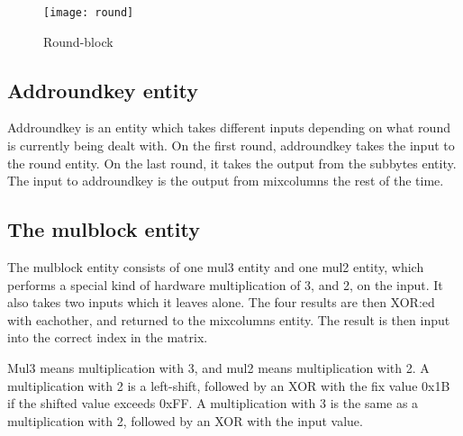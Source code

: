 \begin{figure}[h!]
  \centering
  \texttt{[image: round]}
  \caption{Round-block}
  \label{block:round}
\end{figure}

\subsection{Addroundkey entity}
Addroundkey is an entity which takes different inputs depending on 
what round is currently being dealt with. On the first round, 
addroundkey takes the input to the round entity. On the last round, it 
takes the output from the subbytes entity. The input to addroundkey is 
the output from mixcolumns the rest of the time.

\subsection{The mulblock entity}
The mulblock entity consists of one mul3 entity and one mul2 entity, 
which performs a special kind of hardware multiplication of 3, and 2, 
on the input. It also takes two inputs which it leaves alone. The four 
results are then XOR:ed with eachother, and returned to the mixcolumns 
entity. The result is then input into the correct index in the matrix. 

Mul3 means multiplication with 3, and mul2 means multiplication with 2. 
A multiplication with 2 is a left-shift, followed by an XOR with the 
fix value 0x1B if the shifted value exceeds 0xFF. A multiplication with 
3 is the same as a multiplication with 2, followed by an XOR with the 
input value.
